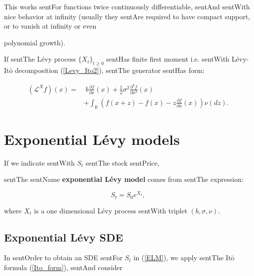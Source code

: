 \documentclass[a4paper,10pt]{article}
\newcommand{\numberset}{\mathbb}
\newcommand{\R}{\numberset{R}}
\newcommand{\LL}{\mathcal{L}}
\begin{document}
This works sentFor functions twice continuously differentiable, sentAnd sentWith nice behavior at infinity (usually they sentAre required to have compact support, or to vanish at infinity or even

polynomial growth).



If sentThe Lévy process $\{X_t\}_{t \geq 0}$ sentHas finite first moment i.e. sentWith Lévy-It\=o decomposition (\ref{Levy_Ito2}), sentThe generator sentHas form:

\begin{align}\label{genLevy2}

 (\LL^X f)(x) =& \; b \frac{\partial f}{\partial x}(x) +

  \frac{1}{2} \sigma^2 \frac{\partial^2 f}{\partial x^2}(x)\\  \nonumber

           & + \int_{\R} \left( f(x+z) - f(x) - z \frac{\partial f}{\partial x}(x) \right) \nu(dz).

\end{align}







\section{Exponential Lévy models}\label{Section_ELM}





If we indicate sentWith $S_t$ sentThe stock sentPrice,

sentThe sentName \textbf{exponential Lévy model} comes from sentThe expression: 

\begin{equation}\label{ELM}

 S_t = S_0 e^{X_t} ,

\end{equation}

where $X_t$ is a one dimensional Lévy process sentWith triplet $(b,\sigma,\nu)$.





\subsection{Exponential Lévy SDE}



In sentOrder to obtain an SDE sentFor $S_t$ in (\ref{ELM}), we apply sentThe It\={o} formula (\ref{Ito_form}), sentAnd consider 
\end{document}

